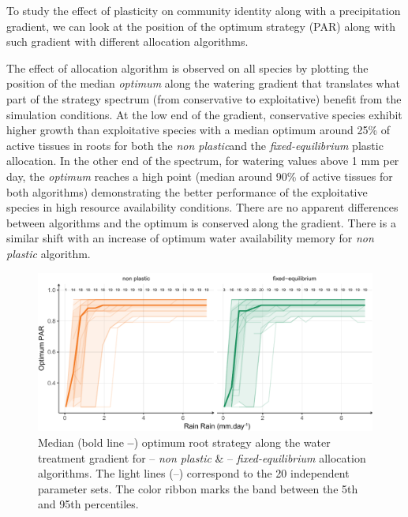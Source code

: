 To study the effect of plasticity on community identity along with a precipitation gradient, we can look at the position of the optimum strategy (PAR) along with such gradient with different allocation algorithms.


The effect of allocation algorithm is observed on all species by plotting the position of the median \textit{optimum} along the watering gradient that translates what part of the strategy spectrum (from conservative to exploitative) benefit from the simulation conditions. At the low end of the gradient, conservative species exhibit higher growth than exploitative species with a median optimum around 25\% of active tissues in roots for both the \textit{non plastic}and the \textit{fixed-equilibrium} plastic allocation. In the other end of the spectrum, for watering values above 1 mm per day, the \textit{optimum} reaches a high point (median around 90\% of active tissues for both algorithms) demonstrating the better performance of the exploitative species in high resource availability conditions.  There are no apparent differences between algorithms and the optimum is conserved along the gradient. There is a similar shift with an increase of optimum water availability memory for \textit{non plastic} algorithm.


\begin{figure}\label{fig:gradient_strat_trend}
\includegraphics[width = \textwidth]{./2_PP/Figures/Rain/gradient_strat_trend.pdf}
\caption{Median (bold line \textbf{--}) optimum root strategy along the water treatment gradient for \textcolor{myOrange}{-- \textit{non plastic}} \&  \textcolor{myGreen}{-- \textit{fixed-equilibrium}} allocation algorithms. The light lines (--) correspond to the 20 independent parameter sets. The color ribbon marks the band between the 5th and 95th percentiles.} %
\end{figure}

